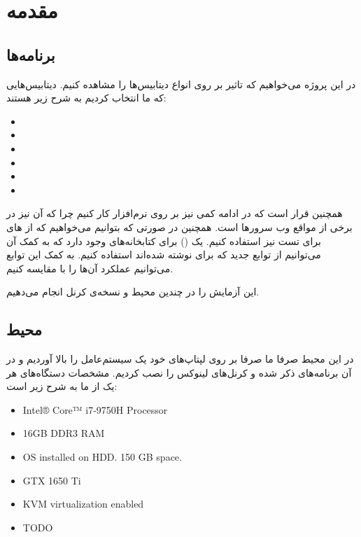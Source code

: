\section{مقدمه}
\subsection{برنامه‌ها}
در این پروژه می‌خواهیم که تاثیر
بر روی انواع دیتابیس‌ها را مشاهده کنیم. دیتابیس‌هایی که ما انتخاب کردیم به شرح زیر هستند:
\begin{itemize}
	\item {}
	\item {}
	\item {}
	\item {}
	\item {}
	\item {}
\end{itemize}
همچنین قرار است که در ادامه کمی نیز بر روی نرم‌افزار
کار کنیم چرا که آن نیز در برخی از مواقع
وب سرور‌ها است. همچنین در صورتی که بتوانیم می‌خواهیم که از
های
برای تست نیز استفاده کنیم. یک
()
برای کتابخانه‌های
وجود دارد که به کمک آن می‌توانیم از توابع جدید
که برای
نوشته شده‌اند استفاده کنیم. به کمک این توابع می‌توانیم عملکرد آن‌ها را با
مقایسه کنیم.

این آزمایش را در چندین محیط و نسخه‌ی کرنل انجام می‌دهیم.
\subsection{محیط‌ }
در این محیط صرفا ما صرفا بر روی لپتاپ‌های خود یک سیستم‌عامل
را بالا آوردیم و در آن برنامه‌های ذکر شده و کرنل‌های لینوکس را نصب کردیم. مشخصات دستگاه‌های هر یک از ما به شرح
زیر است:

\begin{latin}
\begin{itemize}
	\item Intel® Core™ i7-9750H Processor
	\item 16GB DDR3 RAM
	\item OS installed on HDD. 150 GB space.
	\item GTX 1650 Ti
	\item KVM virtualization enabled
\end{itemize}
\end{latin}
\begin{latin}
\begin{itemize}
	\item TODO
\end{itemize}
\end{latin}

